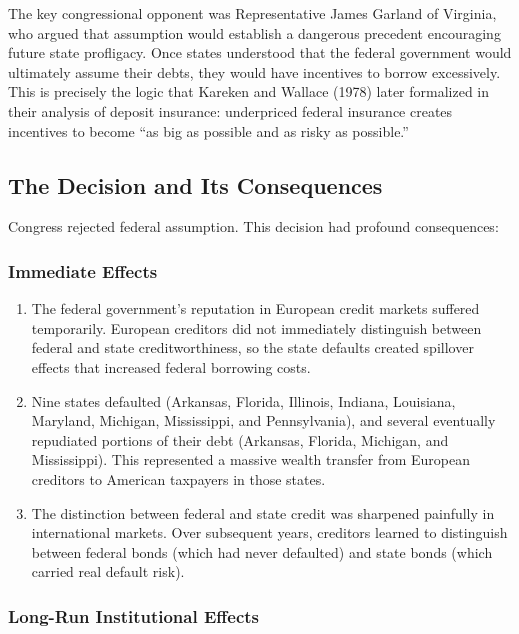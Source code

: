 \documentclass[12pt]{article}
\begin{document}
The key congressional opponent was Representative James Garland of Virginia, who argued that assumption would establish a dangerous precedent encouraging future state profligacy. Once states understood that the federal government would ultimately assume their debts, they would have incentives to borrow excessively. This is precisely the logic that Kareken and Wallace (1978) later formalized in their analysis of deposit insurance: underpriced federal insurance creates incentives to become ``as big as possible and as risky as possible.''

\subsection{The Decision and Its Consequences}

Congress rejected federal assumption. This decision had profound consequences:

\subsubsection{Immediate Effects}

\begin{enumerate}
\item The federal government's reputation in European credit markets suffered temporarily. European creditors did not immediately distinguish between federal and state creditworthiness, so the state defaults created spillover effects that increased federal borrowing costs.

\item Nine states defaulted (Arkansas, Florida, Illinois, Indiana, Louisiana, Maryland, Michigan, Mississippi, and Pennsylvania), and several eventually repudiated portions of their debt (Arkansas, Florida, Michigan, and Mississippi). This represented a massive wealth transfer from European creditors to American taxpayers in those states.

\item The distinction between federal and state credit was sharpened painfully in international markets. Over subsequent years, creditors learned to distinguish between federal bonds (which had never defaulted) and state bonds (which carried real default risk).
\end{enumerate}

\subsubsection{Long-Run Institutional Effects}
\end{document}
